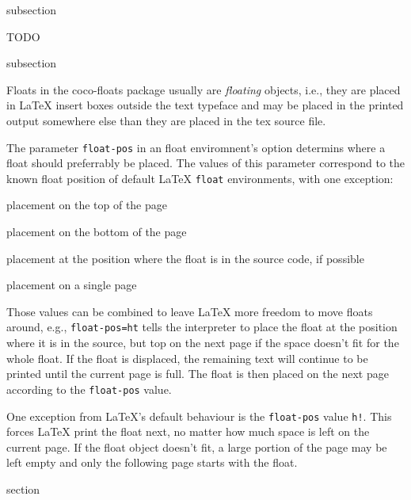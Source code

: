 \begin{Heading}[label=sec:flt:classes]{subsection}
\end{Heading}

TODO

\begin{Heading}[label=sec:flt:floatpos]{subsection}
\end{Heading}

Floats in the coco-floats package usually are \textit{floating}
objects, i.e., they are placed in {\LaTeX} insert boxes outside the
text typeface and may be placed in the printed output somewhere else
than they are placed in the tex source file.

The parameter \lstinline{float-pos} in an float enviromnent's option
determins where a float should preferrably be placed. The values of
this parameter correspond to the known float position of default LaTeX
\lstinline{float} environments, with one exception:
\begin{description}[5mm]
\item[t] placement on the top of the page
\item[b] placement on the bottom of the page
\item[h] placement at the position where the float is in the source code, if possible
\item[p] placement on a single page
\end{description}
Those values can be combined to leave {\LaTeX} more freedom to move
floats around, e.g., \lstinline{float-pos=ht} tells the interpreter to
place the float at the position where it is in the source, but top on
the next page if the space doesn't fit for the whole float. If the
float is displaced, the remaining text will continue to be printed
until the current page is full. The float is then placed on the next
page according to the \lstinline{float-pos} value.

One exception from \LaTeX's default behaviour is the
\lstinline{float-pos} value \lstinline{h!}. This forces LaTeX print
the float next, no matter how much space is left on the current
page. If the float object doesn't fit, a large portion of the page may
be left empty and only the following page starts with the float.



\begin{Heading}{section}
\end{Heading}

